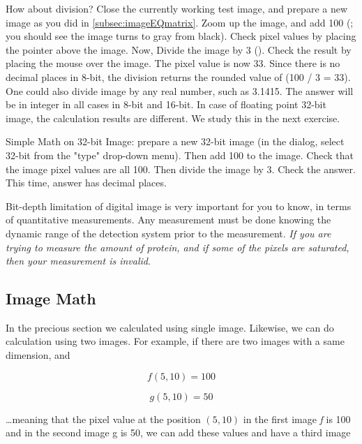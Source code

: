 \begin{indentexercise}{1}
How about division? Close the currently working test image, and prepare
a new image as you did in \ref{subsec:imageEQmatrix}. Zoom up the image, and add 100
(; you
should see the image turns to gray from black). Check pixel values by
placing the pointer above the image. Now, Divide the image by 3
().
Check the result by placing the mouse over the image. The pixel value
is now 33. Since there is no decimal places in 8-bit, the division
returns the rounded value of (100 / 3 = 33). One could also divide
image by any real number, such as 3.1415. The answer will be in integer
in all cases in 8-bit and 16-bit. In case of floating point 32-bit
image, the calculation results are different. We study this in the next
exercise. 
\end{indentexercise}

\begin{indentexercise}{2}
Simple Math on 32-bit Image: prepare a new
32-bit image (in the  dialog,
select 32-bit from the "type"
drop-down menu). Then add 100 to the image. Check that the image pixel
values are all 100. Then divide the image by 3. Check the answer. This
time, answer has decimal places. 
\end{indentexercise}

Bit-depth limitation of digital image is very important for you to know,
in terms of quantitative measurements. Any measurement must be done
knowing the dynamic range of the detection system prior to the
measurement. \textit{If you are trying to measure the amount of
protein, and if some of the pixels are saturated, then your measurement
is invalid}. 

\subsection{Image Math }

In the precious section we calculated using single image. Likewise, we
can do calculation using two images. For example, if there are two
images with a same dimension, and 

\begin{equation}
f(5, 10) = 100
\end{equation}

\begin{equation}
g(5, 10) = 50
\end{equation}

\ldots meaning that the pixel value at the position $(5, 10)$ in the
first image \textit{f} is 100 and in the second image g is 50, we can
add these values and have a third image

